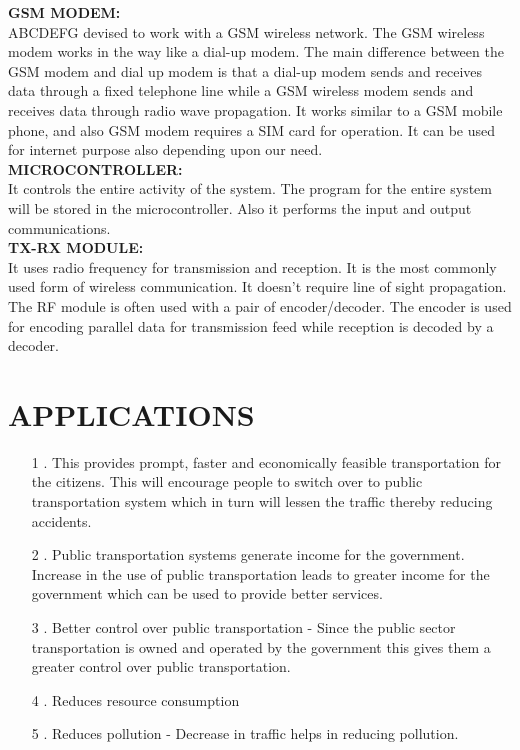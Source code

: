 \documentclass[12pt,a4paper,oneside]{report}
\begin{document}
\begin{onehalfspacing}
\begin{enumerate}
\textbf{GSM MODEM:}\\
ABCDEFG
devised to work with a GSM wireless network. The GSM wireless modem works in the way like a dial-up modem. The main difference between the GSM modem and dial up modem is that a dial-up modem sends and receives data through a fixed telephone line while a GSM wireless modem sends and receives data through radio wave propagation.  It works similar to a GSM mobile phone, and also GSM modem requires a SIM card for operation. It can be used for internet purpose also depending upon our need.\\

\textbf{MICROCONTROLLER:}\\
 It controls the entire activity of the system. The program for the entire system will be stored in the microcontroller. Also it performs the input and output communications. \\
 
\textbf{TX-RX  MODULE:}\\
It uses radio frequency for transmission and reception. It is the most commonly used form of wireless communication. It doesn't require line of sight propagation. The RF module is often used with a pair of encoder/decoder. The encoder is used for encoding parallel data for transmission feed while reception is decoded by a decoder.  \\



\section{APPLICATIONS}
\par
\hspace{.7cm}
\begin{enumerate}	
\item[1]. This provides prompt, faster and economically feasible transportation for the citizens. This will encourage people to switch over to public transportation system which in turn will lessen the traffic thereby reducing accidents.
\item[2]. Public transportation systems generate income for the government. Increase in the use of public transportation leads to greater income for the government which can be used to provide better services.
\item[3]. Better control over public transportation - Since the public sector transportation is owned and operated by the government this gives them a greater control over public transportation.
\item[4]. Reduces resource consumption
\item[5]. Reduces pollution - Decrease in traffic helps in reducing pollution.
\end{enumerate}


\end{enumerate}
\end{onehalfspacing}
\end{document}
